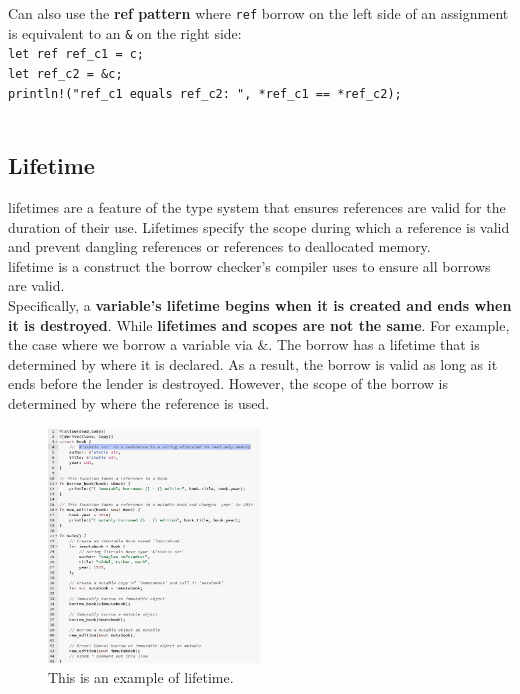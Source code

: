 \documentclass{article}
\begin{document}
Can also use the \textbf{ref pattern} where \texttt{ref} borrow on the left side of an assignment is equivalent to an \texttt{\&} on the right side:\\
\texttt{let ref ref\_c1 = c;}\\
\texttt{let ref\_c2 = \&c;}\\
\texttt{println!("ref\_c1 equals ref\_c2: {}", *ref\_c1 == *ref\_c2);}\\
\\


\subsection{Lifetime}
lifetimes are a feature of the type system that ensures references are valid for the duration of their use. Lifetimes specify the scope during which a reference is valid and prevent dangling references or references to deallocated memory.\\
lifetime is a construct the borrow checker's compiler uses to ensure all borrows are valid.\\ Specifically, a \textbf{variable's lifetime begins when it is created and ends when it is destroyed}. While \textbf{lifetimes and scopes are not the same}.
For example, the case where we borrow a variable via \&. The borrow has a lifetime that is determined by where it is declared. As a result, the borrow is valid as long as it ends before the lender is destroyed. However, the scope of the borrow is determined by where the reference is used.

\begin{figure}[h]
  \centering
  \includegraphics[width=0.5\textwidth]{images/mutable_reference.png} 
  \caption{This is an example of lifetime.}
  \label{fig:lifetime_example}
\end{figure}
\end{document}
